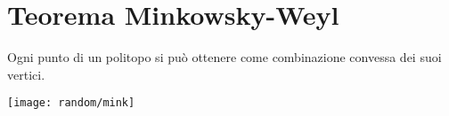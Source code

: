 \documentclass[\main/main.tex]{subfiles}
\begin{document}
\section{Teorema Minkowsky-Weyl}

\begin{minipage}{\textwidth}
  \begin{minipage}{.83\textwidth}
    \flushleft
    \begin{theorem}
      Ogni punto di un politopo si può ottenere come combinazione convessa dei suoi vertici.
    \end{theorem}
  \end{minipage}\hfill
  \begin{minipage}{0.15\textwidth}\center
    \texttt{[image: random/mink]}
  \end{minipage}
\end{minipage}
\end{document}
